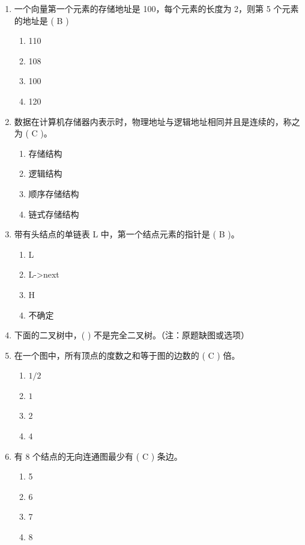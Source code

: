 \documentclass[12pt, a4paper]{article}
\begin{document}
\begin{enumerate}[label=\arabic*、]
    \item 一个向量第一个元素的存储地址是 100，每个元素的长度为 2，则第 5 个元素的地址是 ( B )
    \begin{enumerate}
        \item 110
        \item 108
        \item 100
        \item 120
    \end{enumerate}

    \item 数据在计算机存储器内表示时，物理地址与逻辑地址相同并且是连续的，称之为 ( C )。
    \begin{enumerate}
        \item 存储结构
        \item 逻辑结构
        \item 顺序存储结构
        \item 链式存储结构
    \end{enumerate}

    \item 带有头结点的单链表 L 中，第一个结点元素的指针是 ( B )。
    \begin{enumerate}
        \item L
        \item L->next
        \item H
        \item 不确定
    \end{enumerate}

    \item 下面的二叉树中，( ) 不是完全二叉树。（注：原题缺图或选项）

    \item 在一个图中，所有顶点的度数之和等于图的边数的 ( C ) 倍。
    \begin{enumerate}
        \item $1/2$
        \item $1$
        \item $2$
        \item $4$
    \end{enumerate}

    \item 有 8 个结点的无向连通图最少有 ( C ) 条边。
    \begin{enumerate}
        \item 5
        \item 6
        \item 7
        \item 8
    \end{enumerate}
\end{enumerate}
\end{document}
